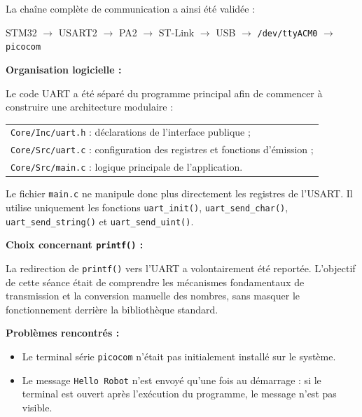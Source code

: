 \documentclass[11pt,a4paper]{article}
\begin{document}
\begin{sessionbox}
		La chaîne complète de communication a ainsi été validée :
		
		\begin{center}
			STM32 $\rightarrow$ USART2 $\rightarrow$ PA2 $\rightarrow$ ST-Link $\rightarrow$ USB $\rightarrow$ \texttt{/dev/ttyACM0} $\rightarrow$ \texttt{picocom}
		\end{center}
		
		\vspace{0.3cm}
		
		\textbf{Organisation logicielle :}
		
		Le code UART a été séparé du programme principal afin de commencer à construire une architecture modulaire :
		
		\begin{center}
			\begin{tabular}{l}
				\texttt{Core/Inc/uart.h} : déclarations de l'interface publique ;\\
				\texttt{Core/Src/uart.c} : configuration des registres et fonctions d'émission ;\\
				\texttt{Core/Src/main.c} : logique principale de l'application.
			\end{tabular}
		\end{center}
		
		Le fichier \texttt{main.c} ne manipule donc plus directement les registres de l'USART. Il utilise uniquement les fonctions \texttt{uart\_init()}, \texttt{uart\_send\_char()}, \texttt{uart\_send\_string()} et \texttt{uart\_send\_uint()}.
		
		\vspace{0.3cm}
		
		\textbf{Choix concernant \texttt{printf()} :}
		
		La redirection de \texttt{printf()} vers l'UART a volontairement été reportée. L'objectif de cette séance était de comprendre les mécanismes fondamentaux de transmission et la conversion manuelle des nombres, sans masquer le fonctionnement derrière la bibliothèque standard.
		
		\vspace{0.3cm}
		
		\textbf{Problèmes rencontrés :}
		
		\begin{itemize}
			\item Le terminal série \texttt{picocom} n'était pas initialement installé sur le système.
			\item Le message \texttt{Hello Robot} n'est envoyé qu'une fois au démarrage : si le terminal est ouvert après l'exécution du programme, le message n'est pas visible.
		\end{itemize}
		

\end{sessionbox}
\end{document}
